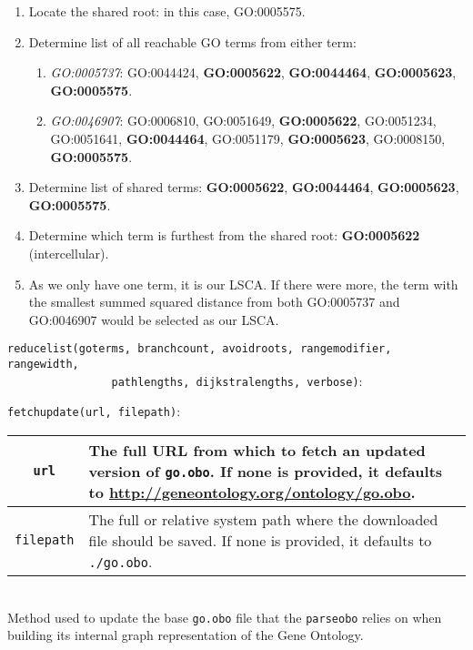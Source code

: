 \documentclass[10pt,a4paper,notitlepage]{article}
\newcommand\ttscore[0]{\underline{\hspace{0.2cm}}}
\begin{document}
\begin{enumerate}[nolistsep]
  \item Locate the shared root: in this case, GO:0005575.
  \item Determine list of all reachable GO terms from either term:
  \begin{enumerate}[nolistsep]
    \item \textit{GO:0005737}: GO:0044424, \textbf{GO:0005622}, \textbf{GO:0044464}, \textbf{GO:0005623}, \textbf{GO:0005575}.
    \item \textit{GO:0046907}: GO:0006810, GO:0051649, \textbf{GO:0005622}, GO:0051234, GO:0051641, \textbf{GO:0044464}, GO:0051179, \textbf{GO:0005623}, GO:0008150, \textbf{GO:0005575}.
  \end{enumerate}
  \item Determine list of shared terms: \textbf{GO:0005622}, \textbf{GO:0044464}, \textbf{GO:0005623}, \textbf{GO:0005575}.
  \item Determine which term is furthest from the shared root: \textbf{GO:0005622} (intercellular).
  \item As we only have one term, it is our LSCA. If there were more, the term with the smallest summed squared distance from both GO:0005737 and GO:0046907 would be selected as our LSCA.
\end{enumerate}

\texttt{reduce\ttscore list(go\ttscore terms, branch\ttscore count, avoid\ttscore roots, range\ttscore modifier, range\ttscore width,}\\ \smallskip
\texttt{\ \ \ \ \ \ \ \ \ \ \ \ \ \ \ \ path\ttscore lengths, dijkstra\ttscore lengths, verbose)}:\\

\pagebreak

\texttt{fetch\ttscore update(url, filepath)}:

\noindent \begin{tabular}{|c|p{5.45in}|} \hline
  \texttt{url} &
  The full URL from which to fetch an updated version of \texttt{go.obo}. If none is provided, it defaults to \url{http://geneontology.org/ontology/go.obo}. \\ \hline
  \texttt{filepath} &
  The full or relative system path where the downloaded file should be saved. If none is provided, it defaults to \texttt{./go.obo}. \\ \hline
\end{tabular}\\
Method used to update the base \texttt{go.obo} file that the \texttt{parse\ttscore obo} relies on when building its internal graph representation of the Gene Ontology.
\end{document}
